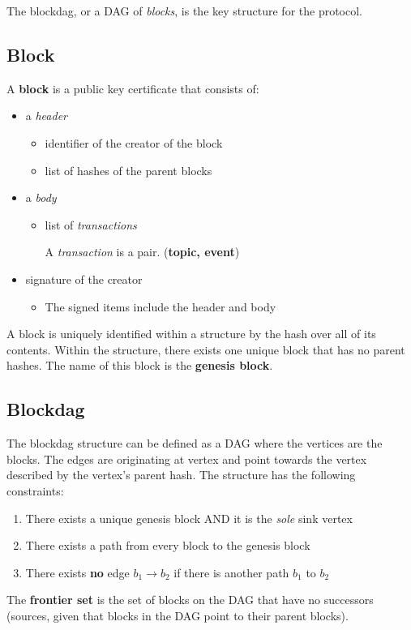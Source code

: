 The blockdag, or a DAG of \emph{blocks}, is the key structure for the
protocol.

\subsection{Block}
A \textbf{block} is a public key certificate that consists of:
\begin{itemize}
    \item a \emph{header}
    \begin{itemize}
        \item{identifier of the creator of the block}
        \item{list of hashes of the parent blocks}
    \end{itemize}
    \item a \emph{body}
        \begin{itemize}
            \item{list of \emph{transactions}}
                \begin{itemize}
                    A \emph{transaction} is a pair. (\textbf{topic, event})
                \end{itemize}
        \end{itemize}
    \item signature of the creator
        \begin{itemize}
            \item{The signed items include the header and body}
        \end{itemize}
\end{itemize}
A block is uniquely identified within a structure by the hash over all of its
contents. Within the structure, there exists one unique block that has no
parent hashes. The name of this block is the \textbf{genesis block}.

\subsection{Blockdag}
The blockdag structure can be defined as a DAG where the vertices are
the blocks. The edges are originating at vertex and point towards the vertex
described by the vertex's parent hash. The structure has the following
constraints:
\begin{enumerate}
    \item{There exists a unique genesis block AND it is the \emph{sole} sink vertex}
    \item{There exists a path from every block to the genesis block}
    \item{There exists \textbf{no} edge $b_1 \rightarrow b_2$ if there is 
    another path $b_1$ to $b_2$}
\end{enumerate}
The \textbf{frontier set} is the set of blocks on the DAG that have no
successors (sources, given that blocks in the DAG point to their parent
blocks).
